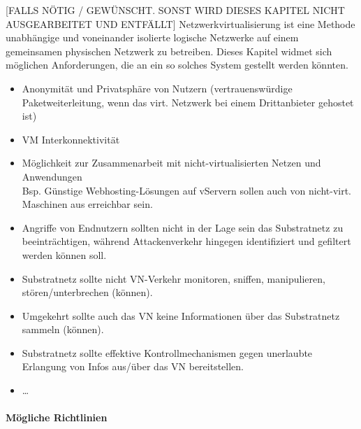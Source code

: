 [FALLS NÖTIG / GEWÜNSCHT. SONST WIRD DIESES KAPITEL NICHT AUSGEARBEITET UND ENTFÄLLT] Netzwerkvirtualisierung ist eine Methode unabhängige und voneinander isolierte logische Netzwerke auf einem gemeinsamen physischen Netzwerk zu betreiben. Dieses Kapitel widmet sich möglichen Anforderungen, die an ein so solches System gestellt werden könnten.


\begin{itemize}
\item	Anonymität und Privatsphäre von Nutzern (vertrauenswürdige Paketweiterleitung, wenn das virt. Netzwerk bei einem Drittanbieter gehostet ist)
\item	VM Interkonnektivität
\item	Möglichkeit zur Zusammenarbeit mit nicht-virtualisierten Netzen und Anwendungen\\	Bsp. Günstige Webhosting-Lösungen auf vServern sollen auch von nicht-virt. Maschinen aus erreichbar sein.
\item	Angriffe von Endnutzern sollten nicht in der Lage sein das Substratnetz zu beeinträchtigen, während Attackenverkehr hingegen identifiziert und gefiltert werden können soll.
\item	Substratnetz sollte nicht VN-Verkehr monitoren, sniffen, manipulieren, stören/unterbrechen (können).
\item	Umgekehrt sollte auch das VN keine Informationen über das Substratnetz sammeln (können).
\item	Substratnetz sollte effektive Kontrollmechanismen gegen unerlaubte Erlangung von Infos aus/über das VN bereitstellen.
\item	\dots
\end{itemize}


\paragraph*{Mögliche Richtlinien}

